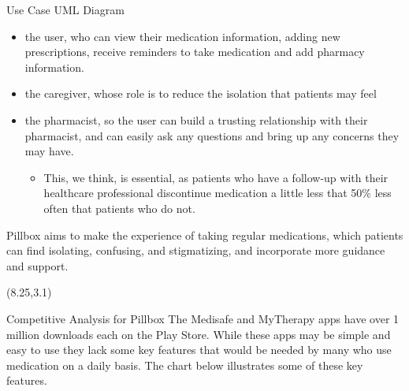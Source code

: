 \documentclass[22pt]{beamer}
\begin{document}
\begin{frame}[fragile]
\begin{textblock}{7.25}
\begin{block}{Use Case UML Diagram}
\begin{itemize} 
\item the user, who can view their medication information, adding new prescriptions, receive reminders to take medication and add pharmacy information. 
\item the caregiver, whose role is to reduce the isolation that patients may feel
\item the pharmacist,  so the user can build a trusting relationship with their pharmacist, and can easily ask any questions and bring up any concerns they may have. 
\begin{itemize}
\item This, we think, is essential, as patients who have a follow-up with their healthcare professional discontinue medication a little less that 50\%  \cite{selmesmitchell2007} less often that patients who do not.
\end{itemize}


\end{itemize}

Pillbox aims to make the experience of taking regular medications, which patients can find isolating, confusing, and stigmatizing, and incorporate more guidance and support.  \\

\end{block}
\end{textblock}



\begin{textblock}{7.25}(8.25,3.1)
\begin{block}{Competitive Analysis for Pillbox}
The Medisafe and MyTherapy apps have over 1 million downloads each on the Play Store. While these apps may be simple and easy to use they lack some key features that would be needed by many who use medication on a daily basis. The chart below illustrates some of these key features.




\end{block}
\end{textblock}
\end{frame}
\end{document}
